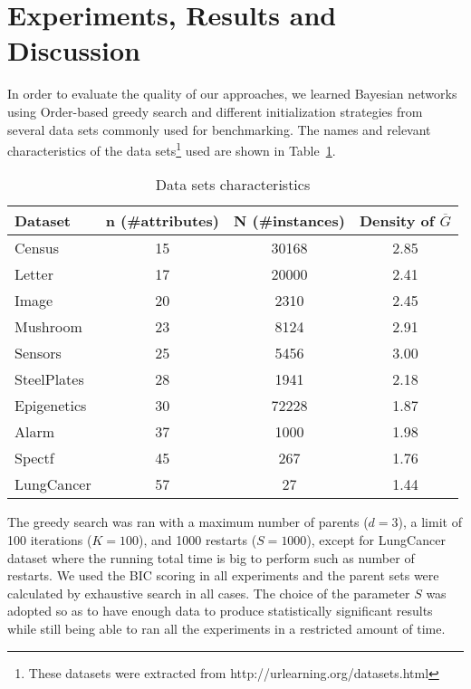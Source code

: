 \section{Experiments, Results and Discussion}
\label{sec:experiments}

In order to evaluate the quality of our approaches, we learned Bayesian networks using Order-based greedy search and different initialization strategies from several data sets commonly used for benchmarking. The names and relevant characteristics of the data sets\footnote{These datasets were extracted from http://urlearning.org/datasets.html} used are shown in Table~\ref{tab:datasets}.
	\begin{table}[ h ]
		\centering
		\begin{tabular}{ | l | c | c | c | }
			\hline
			Dataset & n (\#attributes) & N (\#instances) & Density of $\overline G$ \\ \hline
			Census & 15 & 30168 & 2.85 \\ \hline
			Letter & 17 & 20000 & 2.41 \\ \hline
			Image & 20 & 2310 & 2.45 \\ \hline
			Mushroom & 23 & 8124 & 2.91 \\ \hline
			Sensors & 25 & 5456 & 3.00 \\ \hline
			SteelPlates & 28 & 1941 & 2.18 \\ \hline
			Epigenetics & 30 & 72228 & 1.87 \\ \hline
			Alarm & 37 & 1000 & 1.98 \\ \hline
			Spectf & 45 & 267 & 1.76 \\ \hline
			LungCancer & 57 & 27 & 1.44 \\ \hline
		\end{tabular}
		\caption{Data sets characteristics}
		\label{tab:datasets}
	\end{table}
The greedy search was ran with a maximum number of parents ($d=3$), a limit of 100 iterations ($K=100$), and 1000 restarts ($S=1000$), except for LungCancer dataset where the running total time is big to perform such as number of restarts. We used the BIC scoring in all experiments and the parent sets were calculated by exhaustive search in all cases. The choice of the parameter $S$ was adopted so as to have enough data to produce statistically significant results while still being able to ran all the experiments in a restricted amount of time.

